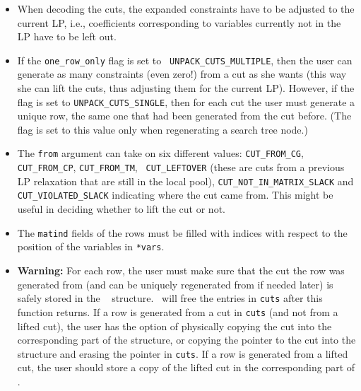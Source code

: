 \item[Notes:] \hfill

\begin{itemize}

\item When decoding the cuts, the expanded constraints have to be adjusted to
the current LP, i.e., coefficients corresponding to variables currently not in
the LP have to be left out.

\item If the {\tt one\_row\_only} flag is set to {\tt
UNPACK\_CUTS\_MULTIPLE}, then the user can generate as many
constraints (even zero!) from a cut as she wants (this way she can
lift the cuts, thus adjusting them for the current LP).
However, if the flag is set to {\tt UNPACK\_CUTS\_SINGLE}, then for
each cut the user must generate a unique row, the same one that had
been generated from the cut before. (The flag is set to this value
only when regenerating a search tree node.)

\item The {\tt from} argument can take on six different values:
{\tt CUT\_FROM\_CG}, {\tt CUT\_FROM\_CP}, {\tt CUT\_FROM\_TM}, {\tt
CUT\_LEFTOVER} (these are cuts from a previous LP relaxation that are
still in the local pool), {\tt CUT\_NOT\_IN\_MATRIX\_SLACK} and {\tt
CUT\_VIOLATED\_SLACK} indicating where the cut came from. This might
be useful in deciding whether to lift the cut or not.

\item The {\tt matind} fields of the rows must be filled with indices with
respect to the position of the variables in {\tt **vars}.

\item {\bf Warning:} For each row, the user must make sure that the
cut the row was generated from (and can be uniquely regenerated from
if needed later) is safely stored in the {\tt 
{}} structure. \BB\ will free the entries in
{\tt cuts} after this function returns. If a row is generated from a
cut in {\tt cuts} (and not from a lifted cut), the user has the option
of physically copying the cut into the corresponding part of the
{\tt {}} structure, or copying the
pointer to the cut into the {\tt {}}
structure and erasing the pointer in {\tt cuts}. If a row is generated
from a lifted cut, the user should store a copy of the lifted cut in
the corresponding part of {\tt {}}.

\end{itemize}


